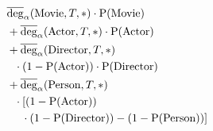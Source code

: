 $\!\begin{aligned}
  &\avgdeg_\alpha(\text{Movie}, T, *) \cdot \sprob(\text{Movie}) \\
  &+ \avgdeg_\alpha(\text{Actor}, T, *) \cdot \sprob(\text{Actor}) \\
  &+ \avgdeg_\alpha(\text{Director}, T, *) \\
  &~~\cdot (1 - \sprob(\text{Actor})) \cdot \sprob(\text{Director}) \\
  &+ \avgdeg_\alpha(\text{Person}, T, *) \\
  &~~\cdot [(1 - \sprob(\text{Actor})) \\
  &~~~~\cdot (1 - \sprob(\text{Director})) - (1 - \sprob(\text{Person}))]
\end{aligned}$

